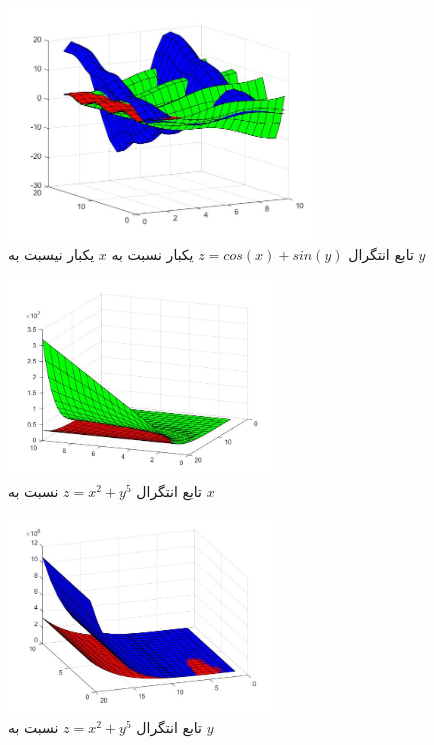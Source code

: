 \documentclass{article}
\begin{document}
\begin{figure}[!h]
    \centering
\includegraphics[width=8.2cm]{pic19codeIntegral.jpg}
 \caption{تابع انتگرال $z=cos(x)+sin(y)$ يکبار نسبت به $x$ يکبار نيسبت به $y$}
    \label{fig:انتگرال خط}
\end{figure}

\begin{figure}[!ht]
    \centering
\includegraphics[width=7cm]{pic20codeIntegral.jpg}
    \caption{تابع انتگرال $z=x^2+y^5$ نسبت به $x$}
    \label{fig:انتگرال خط}
\end{figure}

\begin{figure}[!h]
    \centering
\includegraphics[width=7cm]{pic21codeIntegral.jpg}
 \caption{  تابع انتگرال $z=x^2+y^5$ نسبت به $y$}
    \label{fig:انتگرال خط}
\end{figure}
\end{document}
